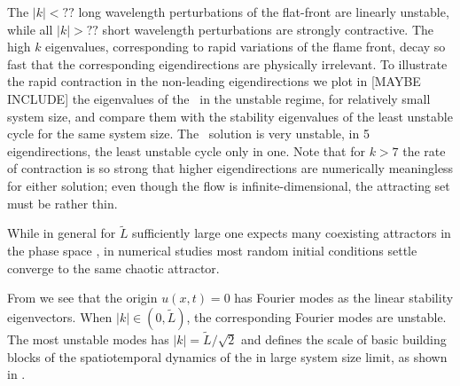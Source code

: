 The $|k|<??$ 
long wavelength perturbations of the flat-front {\eqv}
are linearly unstable, while all 
$|k|> ??$ short wavelength perturbations are strongly contractive.  
The high $k$ eigenvalues, corresponding to rapid variations of
the flame front, decay so fast that the corresponding eigendirections
are physically irrelevant.
To illustrate the rapid contraction in the non-leading eigendirections
we plot  in [MAYBE INCLUDE] %
the eigenvalues of the \eqv\ in the unstable regime,
for relatively small system size, %
and compare them with the
stability eigenvalues of the least unstable cycle for the same 
system size.
The \eqv\ solution is very unstable,
in 5 eigendirections,
the least unstable cycle only in one. 
Note that for $k>7$ the rate of contraction
is so strong that higher eigendirections are numerically meaningless for 
either solution; even though the flow is infinite-dimensional, the attracting
set must be rather thin.

While in general
for $\tilde{L}$ sufficiently large
one expects many 
coexisting attractors in the phase space%
 ,
in numerical studies most random initial
conditions settle converge to the same chaotic attractor. 

From  we see that the origin $u(x,t) = 0$
has Fourier modes as the  linear
stability eigenvectors. 
When $|k| \in (0,\tilde{L})$, the corresponding Fourier modes are
unstable.
The most unstable modes has $|k|=\tilde{L}/\sqrt{2}$ and defines the scale of basic building
blocks of the spatiotemporal dynamics of the {\KSe} in large system size limit,
as shown in . 


